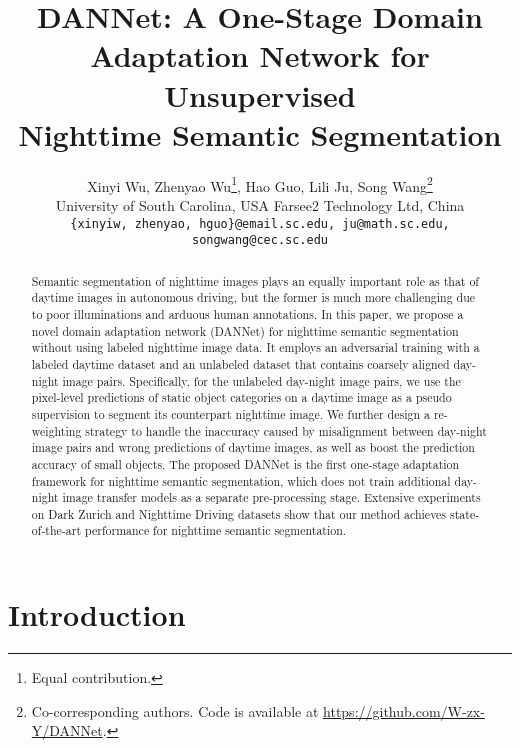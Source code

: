 \documentclass[final]{cvpr}
\begin{document}
\title{DANNet: A One-Stage Domain Adaptation Network for Unsupervised \\ Nighttime Semantic Segmentation}

\author{Xinyi Wu, Zhenyao Wu\thanks{Equal contribution.}, Hao Guo, Lili Ju, Song Wang\thanks{Co-corresponding authors. Code is available at \url{https://github.com/W-zx-Y/DANNet}.}\\
	University of South Carolina, USA \qquad\qquad
    Farsee2 Technology Ltd, China\\
	{\tt\small \{xinyiw, zhenyao, hguo\}@email.sc.edu,  ju@math.sc.edu, songwang@cec.sc.edu}
}
\maketitle
\pagestyle{empty}
\thispagestyle{empty}

\begin{abstract}
	Semantic segmentation of nighttime images plays an equally important role as that of daytime images in autonomous driving,
	but the former is much more challenging due to poor illuminations and arduous human annotations. In this paper, we propose a novel domain adaptation network (DANNet) for nighttime semantic segmentation without using labeled nighttime image data. It employs an adversarial training with a labeled daytime dataset and an unlabeled dataset that contains coarsely aligned day-night image pairs. Specifically, for the unlabeled day-night image pairs, we use the pixel-level predictions of static object categories on a daytime image as a pseudo supervision to segment its counterpart nighttime image. We further design a re-weighting strategy to handle the inaccuracy caused by misalignment between day-night image pairs and wrong predictions of daytime images, as well as boost the prediction accuracy of small objects. The proposed DANNet is the first one-stage adaptation framework for nighttime semantic segmentation, which does not train additional day-night image transfer models as a separate pre-processing stage. Extensive experiments on Dark Zurich and Nighttime Driving datasets show that our method achieves state-of-the-art performance for nighttime semantic segmentation.
\end{abstract}

\section{Introduction}
\end{document}
